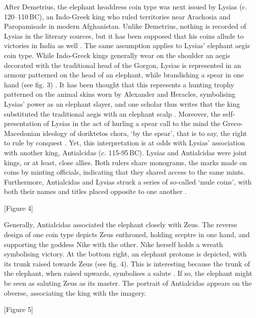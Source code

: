 \documentclass{ijsra}
\renewcommand\BC{{\,BC\xspace}}
\begin{document}
After Demetrius, the elephant headdress coin type was next issued by Lysias (c. 120--110\BC), an Indo-Greek king who ruled
territories near Arachosia and Paropamisade in modern Afghanistan. 
Unlike Demetrius, nothing is recorded of Lysias in the literary sources, but it has been supposed that his coins allude to
victories in India as well \parencite[107]{Widemann2003}.
The same assumption applies to Lysias’ elephant aegis coin type. 
While Indo-Greek kings generally wear on the shoulder an aegis decorated with the traditional head of the Gorgon, Lysias is
represented in an armour patterned on the head of an elephant, while brandishing a spear in one hand (see fig. 3) \parencite[71]{Whitehead1970}. 
It has been thought that this represents a hunting trophy patterned on the animal skins worn by Alexander and Heracles,
symbolising Lysias’ power as an elephant slayer, and one scholar thus writes that the king substituted the traditional aegis with
an elephant scalp \parencite[341]{Cribb2011}. 
Moreover, the self-presentation of Lysias in the act of hurling a spear call to the mind the Greco-Macedonian ideology of
doriktetos chora, ‘by the spear’, that is to say, the right to rule by conquest \parencite[27]{Billows1995}. 
Yet, this interpretation is at odds with Lysias’ association with another king, Antialcidas (c. 115-95\BC). 
Lysias and Antialcidas were joint kings, or at least, close allies. 
Both rulers share monograms, the marks made on coins by minting officials, indicating that they shared access to the same mints. 
Furthermore, Antialcidas and Lysias struck a series of so-called ‘mule coins’, with both their names and titles placed opposite to
one another \parencite[121]{Mairs2014}.

[Figure 4]

Generally, Antialcidas associated the elephant closely with Zeus. The reverse design of one coin type depicts Zeus enthroned,
holding sceptre in one hand, and supporting the goddess Nike with the other.
Nike herself holds a wreath symbolising victory.
At the bottom right, an elephant protome is depicted, with its trunk raised towards Zeus (see fig. 4).
This is interesting because the trunk of the elephant, when raised upwards, symbolises a salute \parencite[33--34]{Whitehead1970}.
If so, the elephant might be seen as saluting Zeus as its master.
The portrait of Antialcidas appears on the obverse, associating the king with the imagery. 

[Figure 5]
\end{document}
